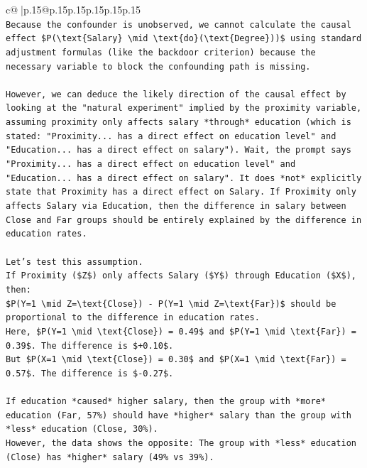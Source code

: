 \documentclass{article}
\begin{document}
{\begin{supertabular}{c@{$\;$}|p{.15\linewidth}@{}p{.15\linewidth}p{.15\linewidth}p{.15\linewidth}p{.15\linewidth}p{.15\linewidth}}
{{{\\ 
\texttt{Because the confounder is unobserved, we cannot calculate the causal effect \$P(\textbackslash{}text\{Salary\} \textbackslash{}mid \textbackslash{}text\{do\}(\textbackslash{}text\{Degree\}))\$ using standard adjustment formulas (like the backdoor criterion) because the necessary variable to block the confounding path is missing.} \\
\\ 
\texttt{However, we can deduce the likely direction of the causal effect by looking at the "natural experiment" implied by the proximity variable, assuming proximity only affects salary *through* education (which is stated: "Proximity... has a direct effect on education level" and "Education... has a direct effect on salary"). Wait, the prompt says "Proximity... has a direct effect on education level" and "Education... has a direct effect on salary". It does *not* explicitly state that Proximity has a direct effect on Salary. If Proximity only affects Salary via Education, then the difference in salary between Close and Far groups should be entirely explained by the difference in education rates.} \\
\\ 
\texttt{Let's test this assumption.} \\
\texttt{If Proximity (\$Z\$) only affects Salary (\$Y\$) through Education (\$X\$), then:} \\
\texttt{\$P(Y=1 \textbackslash{}mid Z=\textbackslash{}text\{Close\}) {-} P(Y=1 \textbackslash{}mid Z=\textbackslash{}text\{Far\})\$ should be proportional to the difference in education rates.} \\
\texttt{Here, \$P(Y=1 \textbackslash{}mid \textbackslash{}text\{Close\}) = 0.49\$ and \$P(Y=1 \textbackslash{}mid \textbackslash{}text\{Far\}) = 0.39\$. The difference is \$+0.10\$.} \\
\texttt{But \$P(X=1 \textbackslash{}mid \textbackslash{}text\{Close\}) = 0.30\$ and \$P(X=1 \textbackslash{}mid \textbackslash{}text\{Far\}) = 0.57\$. The difference is \${-}0.27\$.} \\
\\ 
\texttt{If education *caused* higher salary, then the group with *more* education (Far, 57\%) should have *higher* salary than the group with *less* education (Close, 30\%).} \\
\texttt{However, the data shows the opposite: The group with *less* education (Close) has *higher* salary (49\% vs 39\%).} \\
\\ 
}}}
\end{supertabular}}
\end{document}
